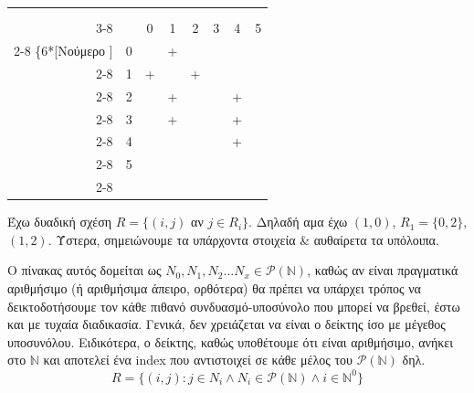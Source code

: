 \documentclass[]{article}
\begin{document}
\begin{center}
	\begin{tabular}{rl|c|c|c|c|c|c|}
		\multicolumn{2}{c}{} & \multicolumn{6}{c}{\makebox[0pt]{\footnotesize Αύξων Αρ.}} \\[-1ex]
		\multicolumn{2}{c}{} & \multicolumn{6}{c}{\downbracefill} \\
		\cline{3-8}
		& & 0 & 1 & 2 & 3 & 4 & 5 \\ \cline{2-8}
		\ldelim\{{6}{*}[{\footnotesize Νούμερο }] & \multicolumn{1}{|l|}{0} &   & + &   &   &   &   \\ \cline{2-8}
		& \multicolumn{1}{|l|}{1} & + &   & + &   &   &   \\ \cline{2-8}
		& \multicolumn{1}{|l|}{2} &   & + &   &   & + &   \\ \cline{2-8}
		& \multicolumn{1}{|l|}{3} &   & + &   &   & + &   \\ \cline{2-8}
		& \multicolumn{1}{|l|}{4} &   &   &   &   & + &   \\ \cline{2-8}
		& \multicolumn{1}{|l|}{5} &   &   &   &   &   &   \\ \cline{2-8}
	\end{tabular}
\end{center}
 Έχω δυαδική σχέση $R = \{(i,j)$ αν $j \in R_i\}$. Δηλαδή αμα έχω $(1, 0)$, $R_1 = \{0, 2\}$, $(1, 2)$. Ύστερα, σημειώνουμε τα υπάρχοντα στοιχεία \& αυθαίρετα τα υπόλοιπα.


Ο πίνακας αυτός δομείται ως $N_0, N_1, N_2 \dots N_x \in \mathcal{P}(\mathbb{N})$, καθώς αν είναι πραγματικά αριθμήσιμο (ή αριθμήσιμα άπειρο, ορθότερα) θα πρέπει να υπάρχει τρόπος να δεικτοδοτήσουμε τον κάθε πιθανό συνδυασμό-υποσύνολο που μπορεί να βρεθεί, έστω και με τυχαία διαδικασία.
Γενικά, δεν χρειάζεται να είναι ο δείκτης ίσο με μέγεθος υποσυνόλου. Ειδικότερα, ο δείκτης, καθώς υποθέτουμε ότι είναι αριθμήσιμο, ανήκει στο $\mathbb{N}$ και αποτελεί ένα index που αντιστοιχεί σε κάθε μέλος του $\mathcal{P}(\mathbb{N})$ δηλ.
\begin{equation}
	R = \{(i, j) : j \in N_i \land N_i \in \mathcal{P}(\mathbb{N}) \land i \in \mathbb{N}^0\}
\end{equation}
\end{document}
